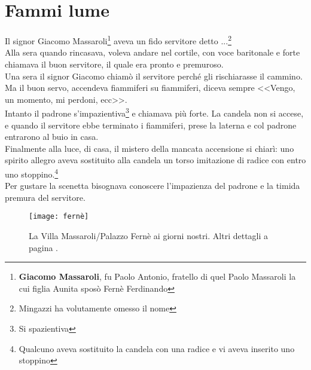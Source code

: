 
\chapter{Fammi lume}
Il signor Giacomo Massaroli\footnote{\textbf{Giacomo Massaroli}, fu Paolo Antonio, fratello di quel  Paolo Massaroli la cui figlia Aunita sposò Fernè Ferdinando} aveva un fido servitore detto ...\footnote{Mingazzi ha volutamente omesso il nome}\\
Alla sera quando rincasava, voleva andare nel cortile, con voce baritonale e forte chiamava il buon servitore, il quale era pronto e premuroso.\\
\indent Una sera il signor Giacomo chiamò il servitore perché gli rischiarasse il cammino. Ma il buon servo, accendeva fiammiferi su fiammiferi, diceva sempre <<Vengo, un momento, mi perdoni, ecc>>.\\
\indent Intanto il padrone s'impazientiva\footnote{Si spazientiva} e chiamava più forte. La candela non si accese, e quando il servitore ebbe terminato i fiammiferi, prese la laterna e col padrone entrarono al buio in casa.\\
\indent Finalmente alla luce, di casa, il mistero della mancata accensione si chiarì: uno spirito allegro aveva sostituito alla candela un torso imitazione di radice con entro uno stoppino.\footnote{Qualcuno aveva sostituito la candela con una radice e vi aveva inserito uno stoppino}\\
\indent Per gustare la scenetta bisognava conoscere l'impazienza del padrone e la timida premura del servitore.


\begin{figure}[htb]
    \centering
    \texttt{[image: fernè]}
    \caption[Palazzo Fernè - Villa Massaroli (2017)]{La Villa Massaroli/Palazzo Fernè ai giorni nostri. Altri dettagli a pagina \pageref{fig:villamassaroli}. \label{fig:ferne}}
\end{figure}